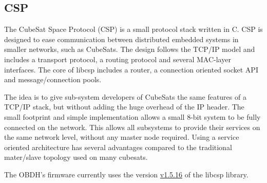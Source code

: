 \subsection{CSP}

The CubeSat Space Protocol (CSP) \cite{csp} is a small protocol stack written in C. CSP is designed to ease communication between distributed embedded systems in smaller networks, such as CubeSats. The design follows the TCP/IP model and includes a transport protocol, a routing protocol and several MAC-layer interfaces. The core of libcsp includes a router, a connection oriented socket API and message/connection pools.

The idea is to give sub-system developers of CubeSats the same features of a TCP/IP stack, but without adding the huge overhead of the IP header. The small footprint and simple implementation allows a small 8-bit system to be fully connected on the network. This allows all subsystems to provide their services on the same network level, without any master node required. Using a service oriented architecture has several advantages compared to the traditional mater/slave topology used on many cubesats.

The OBDH's firmware currently uses the version \href{https://github.com/GomSpace/libcsp/releases/tag/1.5.16}{v1.5.16} of the libcsp library.
